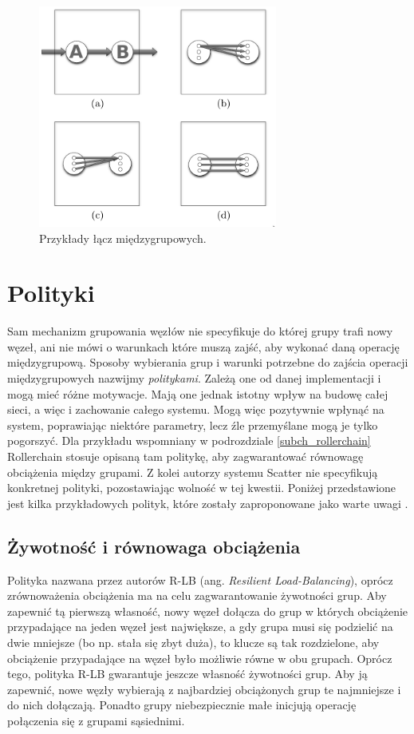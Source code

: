 \documentclass[12pt, twoside, openany]{report}
\begin{document}
\begin{figure}[H]
\centering
\includegraphics[width=0.7\textwidth,height=\textheight,keepaspectratio]{links.png}
\caption{Przykłady łącz międzygrupowych.}
\label{fig:links}
\end{figure}


\section{Polityki}

Sam mechanizm grupowania węzłów nie specyfikuje do której grupy trafi nowy węzeł, ani nie mówi o warunkach które muszą zajść, aby wykonać daną operację międzygrupową. Sposoby wybierania grup i warunki potrzebne do zajścia operacji międzygrupowych nazwijmy \textit{politykami}. Zależą one od danej implementacji i mogą mieć różne motywacje. Mają one jednak istotny wpływ na budowę całej sieci, a więc i zachowanie całego systemu. Mogą więc pozytywnie wpłynąć na system, poprawiając niektóre parametry, lecz źle przemyślane mogą je tylko pogorszyć. Dla przykładu wspomniany w podrozdziale \ref{subch_rollerchain} Rollerchain stosuje opisaną tam politykę, aby zagwarantować równowagę obciążenia między grupami. Z kolei autorzy systemu Scatter nie specyfikują konkretnej polityki, pozostawiając wolność w tej kwestii. Poniżej przedstawione jest kilka przykładowych polityk, które zostały zaproponowane jako warte uwagi \cite{bib:paiva}.

\subsection{Żywotność i równowaga obciążenia}
Polityka nazwana przez autorów R-LB (ang. \textit{Resilient Load-Balancing}), oprócz zrównoważenia obciążenia ma na celu zagwarantowanie żywotności grup. Aby zapewnić tą pierwszą własność, nowy węzeł dołącza do grup w których obciążenie przypadające na jeden węzeł jest największe, a gdy grupa musi się podzielić na dwie mniejsze (bo np. stała się zbyt duża), to klucze są tak rozdzielone, aby obciążenie przypadające na węzeł było możliwie równe w obu grupach. Oprócz tego, polityka R-LB gwarantuje jeszcze własność żywotności grup. Aby ją zapewnić, nowe węzły wybierają z najbardziej obciążonych grup te najmniejsze i do nich dołączają. Ponadto grupy niebezpiecznie małe inicjują operację połączenia się z grupami sąsiednimi.
\end{document}
